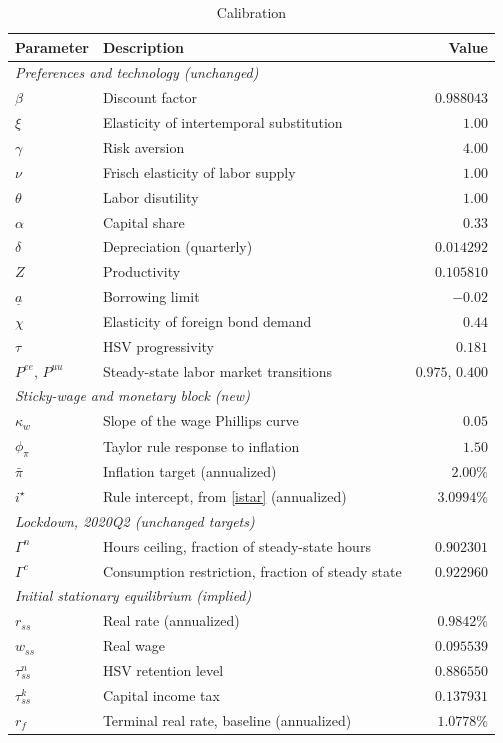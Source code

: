 \begin{table}[t]\centering
\caption{Calibration}\label{tab:calib}
\small
\begin{tabular}{llr}
\toprule
Parameter & Description & Value \\
\midrule
\multicolumn{3}{l}{\textit{Preferences and technology (unchanged)}}\\
$\beta$ & Discount factor & $0.988043$ \\
$\xi$ & Elasticity of intertemporal substitution & $1.00$ \\
$\gamma$ & Risk aversion & $4.00$ \\
$\nu$ & Frisch elasticity of labor supply & $1.00$ \\
$\theta$ & Labor disutility & $1.00$ \\
$\alpha$ & Capital share & $0.33$ \\
$\delta$ & Depreciation (quarterly) & $0.014292$ \\
$Z$ & Productivity & $0.105810$ \\
$\underline{a}$ & Borrowing limit & $-0.02$ \\
$\chi$ & Elasticity of foreign bond demand & $0.44$ \\
$\tau$ & HSV progressivity & $0.181$ \\
$P^{ee}$, $P^{uu}$ & Steady-state labor market transitions & $0.975$, $0.400$ \\
\midrule
\multicolumn{3}{l}{\textit{Sticky-wage and monetary block (new)}}\\
$\kappa_w$ & Slope of the wage Phillips curve & $0.05$ \\
$\phi_\pi$ & Taylor rule response to inflation & $1.50$ \\
$\bar\pi$ & Inflation target (annualized) & $2.00\%$ \\
$i^\star$ & Rule intercept, from \eqref{istar} (annualized) & $3.0994\%$ \\
\midrule
\multicolumn{3}{l}{\textit{Lockdown, 2020Q2 (unchanged targets)}}\\
$\Gamma^n$ & Hours ceiling, fraction of steady-state hours & $0.902301$ \\
$\Gamma^c$ & Consumption restriction, fraction of steady state & $0.922960$ \\
\midrule
\multicolumn{3}{l}{\textit{Initial stationary equilibrium (implied)}}\\
$r_{ss}$ & Real rate (annualized) & $0.9842\%$ \\
$w_{ss}$ & Real wage & $0.095539$ \\
$\tau^n_{ss}$ & HSV retention level & $0.886550$ \\
$\tau^k_{ss}$ & Capital income tax & $0.137931$ \\
$r_f$ & Terminal real rate, baseline (annualized) & $1.0778\%$ \\
\bottomrule
\end{tabular}
\end{table}

